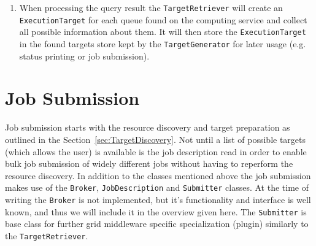 \documentclass{book}
\newcommand{\Broker}{\texttt{Broker}}
\newcommand{\ExecutionTarget}{\texttt{ExecutionTarget}}
\newcommand{\JobDescription}{\texttt{JobDescription}}
\newcommand{\TargetGenerator}{\texttt{TargetGenerator}}
\newcommand{\TargetRetriever}{\texttt{TargetRetriever}}
\newcommand{\Submitter}{\texttt{Submitter}}
\begin{document}
\begin{enumerate}
{  tries to register at the service store kept by the
  {\TargetGenerator}. If allowed to register, the computing server is
  queried and the query result processed. The {\TargetGenerator} will
  not allow registrations from computing services present in its list
  of rejected computing services or from service that have already
  registered once. Computing and services often registers at more than
  one index server, thus different {\TargetRetriever} may discover the
  same service.)}
\item{When processing the query result the {\TargetRetriever} will
  create an {\ExecutionTarget} for each queue found on the computing
  service and collect all possible information about them. It will
  then store the {\ExecutionTarget} in the found targets store kept
  by the {\TargetGenerator} for later usage (e.g. status printing or
  job submission).}
\end{enumerate}

\section{Job Submission}
\label{sec:JobSubmission}

Job submission starts with the resource discovery and target
preparation as outlined in the Section~\ref{sec:TargetDiscovery}.  Not
until a list of possible targets (which allows the user) is available
is the job description read in order to enable bulk job submission of
widely different jobs without having to reperform the resource
discovery. In addition to the classes mentioned above the job
submission makes use of the {\Broker}, {\JobDescription} and
{\Submitter} classes. At the time of writing the {\Broker} is not
implemented, but it's functionality and interface is well known, and
thus we will include it in the overview given here.  The {\Submitter}
is base class for further grid middleware specific specialization
(plugin) similarly to the {\TargetRetriever}.

\begin{figure}[ht]
\end{figure}
\end{document}
